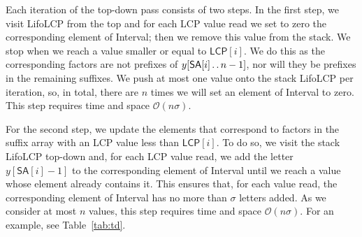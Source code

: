 \documentclass{llncs}
\def\dd{\mathinner{.\,.}}
\newcommand{\cO}{\mathcal{O}}
\newcommand{\SA}{\textsf{SA}}
\newcommand{\LCP}{\textsf{LCP}}
\newcommand{\Interval}{\textsf{Interval}}
\newcommand{\Lifolcp}{\textsf{LifoLCP}}
\begin{document}
  Each iteration of the top-down pass consists of two steps. 
  In the first step, we visit \Lifolcp{} from the top and for each \LCP{} value read we set to zero the corresponding element of \Interval{}; then we remove this value from the stack. 
  We stop when we reach a value smaller or equal to $\LCP{}[i]$.
  We do this as the corresponding factors are not prefixes of $y[\SA{}[i]\dd n-1]$, nor will they be prefixes in the remaining suffixes.
  We push at most one value onto the stack \Lifolcp{} per iteration, so, in total, there are $n$ times we will set an element of \Interval{} to zero.
  This step requires time and space $\cO(n\sigma)$.
  
  For the second step, we update the elements that correspond to factors in the suffix array with an \LCP{} value less than $\LCP{}[i]$.
  To do so, we visit the stack \Lifolcp{} top-down and, for each \LCP{} value read, we add the letter 
  $y[\SA{}[i]-1]$ to the corresponding element of \Interval{} until we reach a value whose element already contains it.
  This ensures that, for each value read, the corresponding element of \Interval{} has no more than $\sigma$ letters added.
  As we consider at most $n$ values, this step requires time and space $\cO(n\sigma)$. For an example, see Table~\ref{tab:td}.
\end{document}
